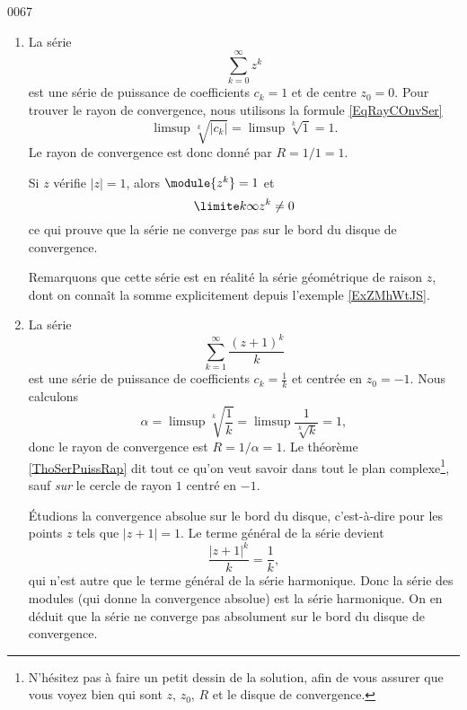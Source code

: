 
\begin{corrige}{0067}

\begin{enumerate}
\item La série
\begin{equation*}
	\sum_{k=0}^\infty z^k
\end{equation*}
est une série de puissance de coefficients $c_k = 1$ et de centre $z_0 = 0$. Pour trouver le rayon de convergence, nous utilisons la formule \eqref{EqRayCOnvSer}
\begin{equation*}
	\limsup\sqrt[k]{| c_k |}=\limsup\sqrt[k]{1}=1.
\end{equation*}
Le rayon de convergence est donc donné par $R = 1/1 = 1$.

Si $z$ vérifie $| z | = 1$, alors $\module{z^k} = 1$ et
\begin{equation*}
	\limite k \infty z^k \neq 0
\end{equation*}
ce qui prouve que la série ne converge pas sur le bord du disque de
convergence.

Remarquons que cette série est en réalité la série géométrique de raison $z$, dont on connaît la somme explicitement depuis l'exemple \ref{ExZMhWtJS}.

\item La série
\begin{equation*}
	\sum_{k=1}^\infty \frac{{(z+1)}^k}{k}
\end{equation*}
est une série de puissance de coefficients $c_k = \frac{1}{ k }$ et centrée en $z_0 = -1$. Nous calculons
\begin{equation}
	\alpha=\limsup\sqrt[k]{\frac{1}{ k }}=\limsup\frac{1}{ \sqrt[k]{k} }=1,
\end{equation}
donc le rayon de convergence est $R = 1/\alpha = 1$. Le théorème \ref{ThoSerPuissRap} dit tout ce qu'on veut savoir dans tout le plan complexe\footnote{N'hésitez pas à faire un petit dessin de la solution, afin de vous assurer que vous voyez bien qui sont $z$, $z_0$, $R$ et le disque de convergence.}, sauf \emph{sur} le cercle de rayon $1$ centré en $-1$.


Étudions la convergence absolue sur le bord du disque, c'est-à-dire pour les points $z$ tels que $| z+1 |=1$. Le terme général de la série devient
\begin{equation}
	\frac{ | z+1 |^k }{ k }=\frac{ 1 }{ k },
\end{equation}
qui n'est autre que le terme général de la série harmonique. Donc la série des modules (qui donne la convergence absolue) est la série harmonique. On en déduit que la série ne converge pas absolument sur le bord du disque de convergence.


\end{enumerate}
\end{corrige}
